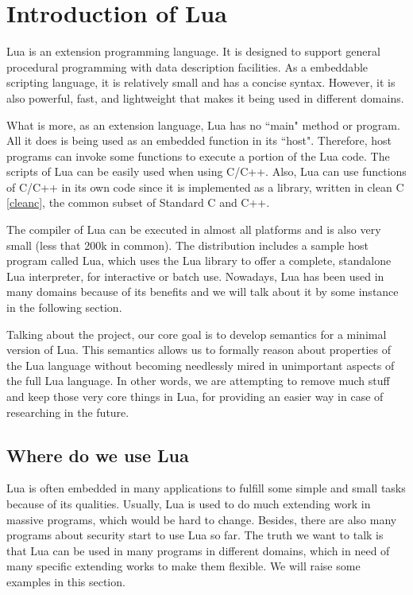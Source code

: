 \chapter{Introduction of Lua}
Lua is an extension programming language. It is designed to support general procedural programming with data description facilities. As a embeddable scripting language, it is relatively small and has a concise syntax. However, it is also powerful, fast, and lightweight that makes it being used in different domains.

What is more, as an extension language, Lua has no ``main" method or program. All it does is being used as an embedded function in its ``host". Therefore, host programs can invoke some functions to execute a portion of the Lua code. The scripts of Lua can be easily used when using C/C++. Also, Lua can use functions of C/C++ in its own code since it is implemented as a library, written in clean C \ref{cleanc}, the common subset of Standard C and C++.

The compiler of Lua can be executed in almost all platforms and is also very small (less that 200k in common). The distribution includes a sample host program called Lua, which uses the Lua library to offer a complete, standalone Lua interpreter, for interactive or batch use. Nowadays, Lua has been used in many domains because of its benefits and we will talk about it by some instance in the following section.

Talking about the project, our core goal is to develop semantics for a minimal version of Lua. This semantics allows us to formally reason about properties of the Lua language without becoming needlessly mired in unimportant aspects of the full Lua language. In other words, we are attempting to remove much stuff and keep those very core things in Lua, for providing an easier way in case of researching in the future.

\section{Where do we use Lua}
Lua is often embedded in many applications to fulfill some simple and small tasks because of its qualities. Usually, Lua is used to do much extending work in massive programs, which would be hard to change. Besides, there are also many programs about security start to use Lua so far. The truth we want to talk is that Lua can be used in many programs in different domains, which in need of many specific extending works to make them flexible. We will raise some examples in this section.

